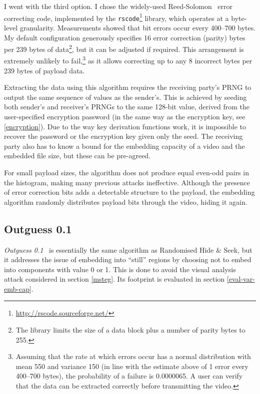 \documentclass[12pt,british,twoside,notitlepage,usenames,dvipsnames,hypens,final]{report}
\numberwithin{equation}{section}
\numberwithin{figure}{section}
\begin{document}
I went with the third option. I chose the widely-used Reed-Solomon~\cite{clarke2002reed} error correcting code, implemented by the \texttt{rscode}\footnote{\url{http://rscode.sourceforge.net/}} library, which operates at a byte-level granularity. Measurements showed that bit errors occur every 400--700 bytes. My default configuration generously specifies 16 error correction (parity) bytes per 239 bytes of data\footnote{The library limits the size of a data block plus a number of parity bytes to 255.}, but it can be adjusted if required. This arrangement is extremely unlikely to fail,\footnote{Assuming that the rate at which errors occur has a normal distribution with mean 550 and variance 150 (in line with the estimate above of 1 error every 400--700 bytes), the probability of a failure is 0.0000065. A user can verify that the data can be extracted correctly before transmitting the video.} as it allows correcting up to any 8 incorrect bytes per 239 bytes of payload data.

Extracting the data using this algorithm requires the receiving party's PRNG to output the same sequence of values as the sender's. This is achieved by seeding both sender's and receiver's PRNGs to the same 128-bit value, derived from the user-specified encryption password (in the same way as the encryption key, see \ref{encryption}). Due to the way key derivation functions work, it is impossible to recover the password or the encryption key given only the seed. The receiving party also has to know a bound for the embedding capacity of a video and the embedded file size, but these can be pre-agreed.

For small payload sizes, the algorithm does not produce equal even-odd pairs in the histogram, making many previous attacks ineffective. Although the presence of error correction bits adds a detectable structure to the payload, the embedding algorithm randomly distributes payload bits through the video, hiding it again.

\subsection{Outguess 0.1}
\label{outguess1}

\emph{Outguess 0.1}~\cite{bateman} is essentially the same algorithm as Randomised Hide \& Seek, but it addresses the issue of embedding into ``still'' regions by choosing not to embed into components with value 0 or 1. This is done to avoid the visual analysis attack considered in section \ref{msteg}. Its footprint is evaluated in section \ref{eval-var-emb-cap}.
\end{document}
